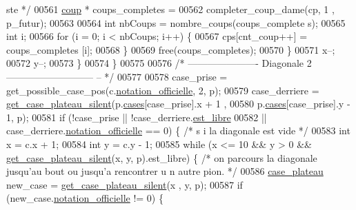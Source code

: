 \begin{DoxyCode}
{      ste */}
00561                                         \hyperlink{structcoup}{coup} * coups\_completes =
00562                                                         completer\_coup\_dame(cp, 1
      , p\_futur);
00563 
00564                                         \textcolor{keywordtype}{int} nbCoups = nombre\_coups(coups\_complete
      s);
00565                                         \textcolor{keywordtype}{int} i;
00566                                         \textcolor{keywordflow}{for} (i = 0; i < nbCoups; i++) \{
00567                                                 cps[cnt\_coup++] = coups\_completes
      [i];
00568                                         \}
00569                                         free(coups\_completes);
00570                                 \}
00571                                 x--;
00572                                 y--;
00573                         \}
00574                 \}
00575 
00576                 \textcolor{comment}{/* ---------------------- Diagonale 2 ---------------------------
      -- */}
00577 
00578                 case\_prise = get\_possible\_case\_pos(c.\hyperlink{structcase__plateau_ad510581b324604a9cf685cbb769a421a}{notation_officielle}, 2, p);
00579                 case\_derriere = \hyperlink{plateau_8h_a60a8f706865d0ae9087f8d65d4667655}{get_case_plateau_silent}(p.\hyperlink{structplateau_a6afaa60f594542e0d742b0c6d3223392}{cases}[case\_prise].x + 1
      ,
00580                                 p.\hyperlink{structplateau_a6afaa60f594542e0d742b0c6d3223392}{cases}[case\_prise].y - 1, p);
00581                 \textcolor{keywordflow}{if} (!case\_prise || !case\_derriere.\hyperlink{structcase__plateau_a173f25d2fd7c653d77ca8174ba4f636d}{est_libre}
00582                                 || case\_derriere.\hyperlink{structcase__plateau_ad510581b324604a9cf685cbb769a421a}{notation_officielle} == 0) \{ \textcolor{comment}{/* s
      i la diagonale est vide */}
00583                         \textcolor{keywordtype}{int} x = c.x + 1;
00584                         \textcolor{keywordtype}{int} y = c.y - 1;
00585                         \textcolor{keywordflow}{while} (x <= 10 && y > 0 && \hyperlink{plateau_8h_a60a8f706865d0ae9087f8d65d4667655}{get_case_plateau_silent}(x, y, 
      p).est\_libre) \{ \textcolor{comment}{/* on parcours la diagonale jusqu'au bout ou jusqu'a rencontrer u
      n autre pion. */}
00586                                 \hyperlink{structcase__plateau}{case_plateau} new\_case = \hyperlink{plateau_8h_a60a8f706865d0ae9087f8d65d4667655}{get_case_plateau_silent}(x
      , y, p);
00587                                 \textcolor{keywordflow}{if} (new\_case.\hyperlink{structcase__plateau_ad510581b324604a9cf685cbb769a421a}{notation_officielle} != 0) \{

\end{DoxyCode}
